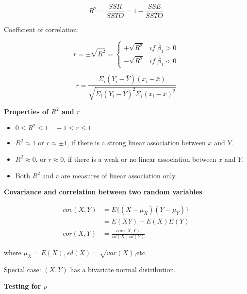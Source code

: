 \documentclass[10pt]{article}
\begin{document}
\begin{multicols}{3}
    \begin{equation}\label{eq: R square}
        R^2 = \frac{SSR}{SSTO} = 1 - \frac{SSE}{SSTO}
    \end{equation}

    Coefficient of correlation:

    \begin{equation}\label{eq: sample r}
        r = \pm \sqrt{R^2} = \begin{cases}
            +\sqrt{R^2} & if \; \hat\beta_1 > 0 \\
            -\sqrt{R^2} & if \; \hat\beta_1 < 0
        \end{cases}
    \end{equation}

    \begin{equation}\label{eq: sample r (alt)}
        r = \frac{\Sigma_i (Y_i - \bar Y) (x_i - \bar x) }{\sqrt{\Sigma_i (Y_i - \bar Y)^2 \Sigma_i (x_i - \bar x)^2}}
    \end{equation}

    \textbf{Properties of $R^2$ and $r$}

    \begin{itemize}
        \item $0 \leq R^2 \leq 1 \quad -1 \leq r \leq 1$
        \item $R^2 \approx 1$ or $r \approx \pm 1$, if there is a strong linear association between $x$ and $Y$.
        \item $R^2 \approx 0$, or $r \approx 0$, if there is a weak or no linear association between $x$ and $Y$.
        \item Both $R^2$ and $r$ are measures of linear association only.
    \end{itemize}

    \textbf{Covariance and correlation between two random variables}

    \begin{align}
        cov(X, Y) & = E\{ (X - \mu_X) (Y - \mu_Y) \} \\
                  & = E(XY) - E(X)E(Y)               \\
        cor(X, Y) & = \frac{cov(X, Y)}{sd(X)sd(Y)}
    \end{align}

    where $\mu_X = E(X), sd(X) = \sqrt{var(X)}$,etc.

    Special case: $(X,Y)$ has a bivariate normal distribution.

    \textbf{Testing for $\rho$}


\end{multicols}
\end{document}
